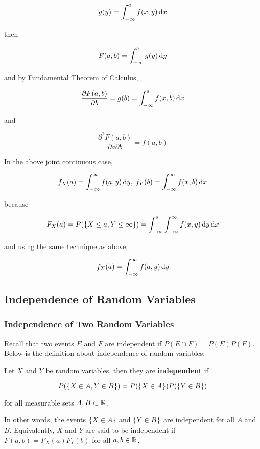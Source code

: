 \documentclass[a4paper,12pt]{article}
\begin{document}
$$g(y)=\int_{-\infty}^{a}f(x,y)\,\mathrm{d} x$$\s

then

$$F(a,b)=\int_{-\infty}^{b}g(y)\,\mathrm{d} y$$\s

and by Fundamental Theorem of Calculus,

$$\frac{\partial F(a,b)}{\partial b}=g(b)=\int_{-\infty}^{a}f(x,b)\,\mathrm{d} x$$\s

and

$$\frac{\partial^{2} F(a,b)}{\partial a\partial b}=f(a,b)$$\s

In the above joint continuous case,

$$f_{X}(a)=\int_{-\infty}^{\infty}f(a,y)\,\mathrm{d} y,\;f_{Y}(b)=\int_{-\infty}^{\infty}f(x,b)\,\mathrm{d} x$$\s

because

$$F_{X}(a)=P(\left\{ X\leq a,Y\leq\infty\right\})=\int_{-\infty}^{a}\int_{-\infty}^{\infty}f(x,y)\,\mathrm{d} y\,\mathrm{d} x$$\s

and using the same technique as above,

$$f_{X}(a)=\int_{-\infty}^{\infty}f(a,y)\,\mathrm{d} y$$

\subsection{Independence of Random Variables}
\subsubsection{Independence of Two Random Variables}
Recall that two events $E$ and $F$ are independent if $P(E\cap F)=P(E)P(F)$. Below is the definition about independence of random variables:\n

\begin{dft}
  Let $X$ and $Y$ be random variables, then they are \textbf{independent} if

  $$P(\left\{ X\in A,Y\in B\right\})=P(\left\{ X\in A\right\})P(\left\{ Y\in B\right\})$$\s

  for all measurable sets $A,B\subset\mathbb{R}$.
\end{dft}\n

In other words, the events $\left\{ X\in A\right\}$ and $\left\{ Y\in B\right\}$ are independent for all $A$ and $B$. Equivalently, $X$ and $Y$ are said to be independent if $F(a,b)=F_{X}(a)F_{Y}(b)$ for all $a,b\in\mathbb{R}$.
\end{document}
